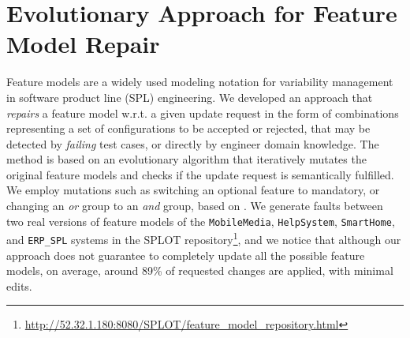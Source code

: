 \documentclass[
12pt, %
oneside, %
english, %
singlespacing, %
headsepline, %
consistentlayout, %
]{MastersDoctoralThesis} %
\theoremstyle{plain}
\theoremstyle{definition}
\theoremstyle{remark}
\theoremstyle{plain}
\theoremstyle{plain}
\theoremstyle{remark}
\begin{document}
\chapter{Evolutionary Approach for Feature Model Repair}
Feature models are a widely used modeling notation for variability management in software product line (SPL) engineering. 
We developed an approach that \textit{repairs} a feature model w.r.t. a given update request in the form of combinations representing a set of configurations to be accepted or rejected, that may be detected by \textit{failing} test cases, or directly by engineer domain knowledge. %
The method is based on an evolutionary algorithm that iteratively mutates the original feature models and checks if the update request is semantically fulfilled.
We employ mutations such as switching an optional feature to mandatory, or changing an \emph{or} group to an \emph{and} group, based on \cite{arcaini2018evolutionary}.
We generate faults between two real versions of feature models of the {\tt MobileMedia}, {\tt HelpSystem},  {\tt SmartHome}, and {\tt ERP\_SPL} systems in the SPLOT repository\footnote{\url{http://52.32.1.180:8080/SPLOT/feature_model_repository.html}}, and we notice that although our approach does not guarantee to completely update all the possible feature models, on average, around 89\% of requested changes are applied, with minimal edits.%

\end{document}
